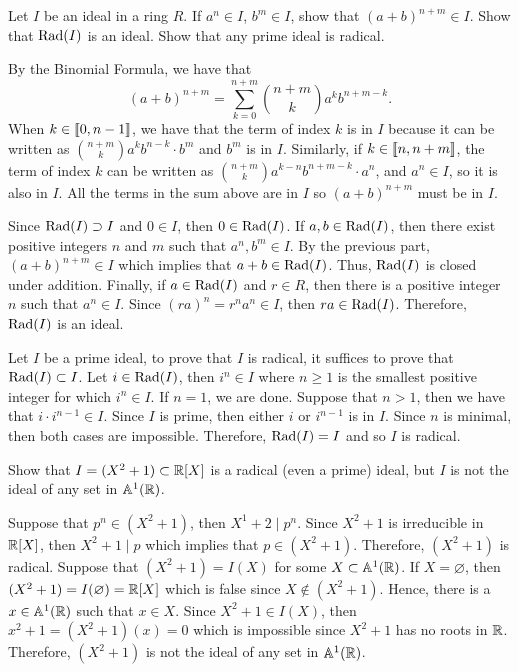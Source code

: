 \begin{exercise}
    Let $I$ be an ideal in a ring $R$. If $a^n \in I$, $b^m \in I$, show that $(a+b)^{n+m} \in I$. Show that $\operatorname{Rad}(I)$ is an ideal. Show that any prime ideal is radical. \\
\end{exercise}

\begin{solution}
    By the Binomial Formula, we have that
    $$(a+b)^{n+m} = \sum_{k=0}^{n+m}\binom{n+m}{k}a^kb^{n+m-k}.$$
    When $k \in \llbracket 0 , n-1 \rrbracket$, we have that the term of index $k$ is in $I$ because it can be written as $\binom{n+m}{k}a^kb^{n-k}\cdot b^m$ and $b^m$ is in $I$. Similarly, if $k \in \llbracket n , n+m \rrbracket$, the term of index $k$ can be written as $\binom{n+m}{k}a^{k-n}b^{n+m-k}\cdot a^n$, and $a^n \in I$, so it is also in $I$. All the terms in the sum above are in $I$ so $(a+b)^{n+m}$ must be in $I$.
    
    Since $\operatorname{Rad}(I) \supset I$ and $0 \in I$, then $0 \in \operatorname{Rad}(I)$. If $a,b \in \operatorname{Rad}(I)$, then there exist positive integers $n$ and $m$ such that $a^n, b^m \in I$. By the previous part, $(a+b)^{n+m} \in I$ which implies that $a+b \in \operatorname{Rad}(I)$. Thus, $\operatorname{Rad}(I)$ is closed under addition. Finally, if $a \in \operatorname{Rad}(I)$ and $r \in R$, then there is a positive integer $n$ such that $a^n \in I$. Since $(ra)^n = r^na^n \in I$, then $ra \in \operatorname{Rad}(I)$. Therefore, $\operatorname{Rad}(I)$ is an ideal.
    
    Let $I$ be a prime ideal, to prove that $I$ is radical, it suffices to prove that $\operatorname{Rad}(I) \subset I$. Let $i \in \operatorname{Rad}(I)$, then $i^n \in I$ where $n \geq 1$ is the smallest positive integer for which $i^n \in I$. If $n = 1$, we are done. Suppose that $n > 1$, then we have that $i\cdot i^{n-1} \in I$. Since $I$ is prime, then either $i$ or $i^{n-1}$ is in $I$. Since $n$ is minimal, then both cases are impossible. Therefore, $\operatorname{Rad}(I) = I$ and so $I$ is radical.\\
\end{solution}

\begin{exercise}
    Show that $I = (X^2 + 1) \subset \mathbb{R}[X]$ is a radical (even a prime) ideal, but $I$ is not the ideal of any set in $\mathbb{A}^1(\mathbb{R})$. \\
\end{exercise}

\begin{solution}
    Suppose that $p^n \in (X^2 + 1)$, then $X^1 + 2 \mid p^n$. Since $X^2 + 1$ is irreducible in $\mathbb{R}[X]$, then $X^2 + 1 \mid p$ which implies that $p \in (X^2 + 1)$. Therefore, $(X^2 + 1)$ is radical. Suppose that $(X^2 + 1) = I(X)$ for some $X \subset \mathbb{A}^1(\mathbb{R})$. If $X = \varnothing$, then $(X^2 + 1) = I(\varnothing) = \mathbb{R}[X]$ which is false since $X \notin (X^2 + 1)$. Hence, there is a $x \in \mathbb{A}^1(\mathbb{R})$ such that $x \in X$. Since $X^2 + 1 \in I(X)$, then $x^2 + 1 = (X^2 + 1)(x) = 0$ which is impossible since $X^2 + 1$ has no roots in $\mathbb{R}$. Therefore, $(X^2 + 1)$ is not the ideal of any set in $\mathbb{A}^1(\mathbb{R})$. \\
\end{solution}

